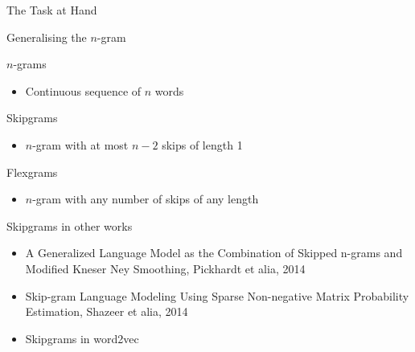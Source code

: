 \documentclass[department=cls, notes={hide notes}, official=true]{beamerruhuisstijl}
\begin{document}
\begin{frame}{The Task at Hand}
\data
\medskip
{}
\end{frame}

\begin{frame}{Generalising the $n$-gram}
	\begin{block}{$n$-grams}
    	\begin{itemize}
        	\item Continuous sequence of $n$ words
        \end{itemize}
    \end{block}
    
    \begin{block}{Skipgrams}
    	\begin{itemize}
        	\item $n$-gram with at most $n-2$ skips of length 1
        \end{itemize}
    \end{block}
    
    \begin{block}{Flexgrams}
    	\begin{itemize}
        	\item $n$-gram with any number of skips of any length
        \end{itemize}
    \end{block}
    \bigskip
    \begin{block}{Skipgrams in other works}
    	\begin{itemize}
        	\item[\PencilRightDown] A Generalized Language Model as the Combination of Skipped n-grams and Modified Kneser Ney Smoothing, Pickhardt et alia, 2014
            \item[\PencilRightDown] Skip-gram Language Modeling Using Sparse Non-negative Matrix Probability Estimation, Shazeer et alia, 2014
            \item[\XSolidBrush] Skipgrams in word2vec
        \end{itemize}
    \end{block}
\end{frame}
\end{document}
